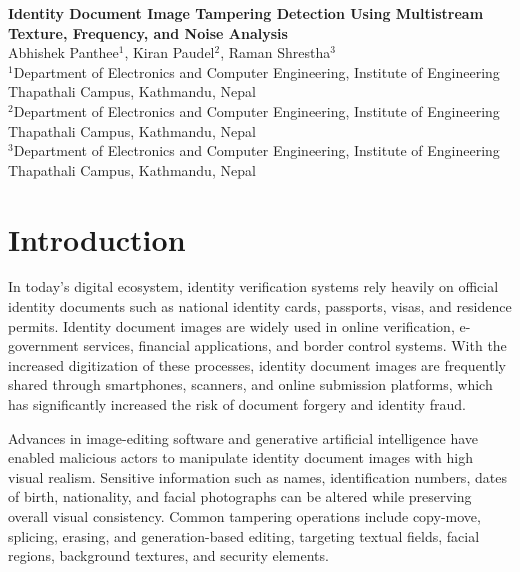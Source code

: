 \documentclass[12pt]{article}
\begin{document}
\begin{center}

    {\fontsize{17pt}{20pt}\selectfont
        \textbf{Identity Document Image Tampering Detection Using Multistream Texture, Frequency, and Noise Analysis}
    }\\[1.2cm]

    {\fontsize{13pt}{16pt}\selectfont
    Abhishek Panthee$^{1}$, Kiran Paudel$^{2}$, Raman Shrestha$^{3}$}\\[0.4cm]

    {\fontsize{8pt}{10pt}\selectfont
    $^{1}$Department of Electronics and Computer Engineering, Institute of Engineering Thapathali Campus, Kathmandu, Nepal\\
    $^{2}$Department of Electronics and Computer Engineering, Institute of Engineering Thapathali Campus, Kathmandu, Nepal\\
    $^{3}$Department of Electronics and Computer Engineering, Institute of Engineering Thapathali Campus, Kathmandu, Nepal\\
    }

\end{center}

\section{Introduction}

In today's digital ecosystem, identity verification systems rely heavily on official identity documents such as national identity cards, passports, visas, and residence permits. Identity document images are widely used in online verification, e-government services, financial applications, and border control systems. With the increased digitization of these processes, identity document images are frequently shared through smartphones, scanners, and online submission platforms, which has significantly increased the risk of document forgery and identity fraud.

Advances in image-editing software and generative artificial intelligence have enabled malicious actors to manipulate identity document images with high visual realism. Sensitive information such as names, identification numbers, dates of birth, nationality, and facial photographs can be altered while preserving overall visual consistency. Common tampering operations include copy-move, splicing, erasing, and generation-based editing, targeting textual fields, facial regions, background textures, and security elements.
\end{document}
